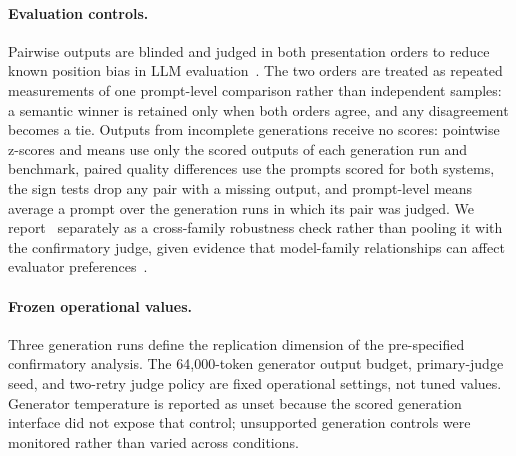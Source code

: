 \paragraph{Evaluation controls.}
Pairwise outputs are blinded and judged in both presentation orders to reduce known position bias in LLM evaluation~\citep{zheng2023judging,wang2024fair}. The two orders are treated as repeated measurements of one prompt-level comparison rather than independent samples: a semantic winner is retained only when both orders agree, and any disagreement becomes a tie. Outputs from incomplete generations receive no scores: pointwise z-scores and means use only the scored outputs of each generation run and benchmark, paired quality differences use the prompts scored for both systems, the sign tests drop any pair with a missing output, and prompt-level means average a prompt over the generation runs in which its pair was judged. We report \modelCross\ separately as a cross-family robustness check rather than pooling it with the confirmatory judge, given evidence that model-family relationships can affect evaluator preferences~\citep{panickssery2024selfpreference}.

\paragraph{Frozen operational values.}
Three generation runs define the replication dimension of the pre-specified confirmatory analysis. The 64,000-token generator output budget, primary-judge seed, and two-retry judge policy are fixed operational settings, not tuned values. Generator temperature is reported as unset because the scored generation interface did not expose that control; unsupported generation controls were monitored rather than varied across conditions.

